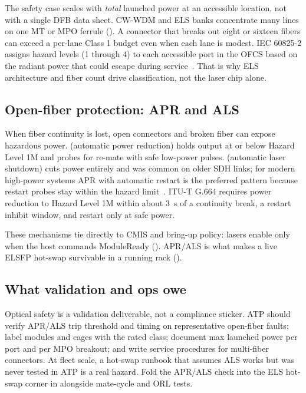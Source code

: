 The safety case scales with \emph{total} launched power at an accessible location,
not with a single DFB data sheet. CW-WDM and ELS banks concentrate many lines on one
MT or MPO ferrule (). A connector that breaks out eight or sixteen
fibers can exceed a per-lane Class 1 budget even when each lane is modest. IEC
60825-2 assigns hazard levels (1 through 4) to each accessible port in the OFCS
based on the radiant power that could escape during service~\cite{iec60825}. That
is why ELS architecture and fiber count drive classification, not the laser chip
alone.

\subsection{Open-fiber protection: APR and ALS}

When fiber continuity is lost, open connectors and broken fiber can expose
hazardous power.  (automatic power reduction) holds
output at or below Hazard Level 1M and probes for re-mate with safe low-power
pulses.  (automatic laser shutdown) cuts power entirely
and was common on older SDH links; for modern high-power systems APR with
automatic restart is the preferred pattern because restart probes stay within the
hazard limit~\cite{g664}. ITU-T G.664 requires power reduction to Hazard Level 1M
within about 3~s of a continuity break, a restart inhibit window, and restart only
at safe power.

These mechanisms tie directly to CMIS and bring-up policy: lasers enable only when
the host commands ModuleReady (). APR/ALS is what makes
a live ELSFP hot-swap survivable in a running rack ().

\subsection{What validation and ops owe}

Optical safety is a validation deliverable, not a compliance sticker. ATP should
verify APR/ALS trip threshold and timing on representative open-fiber faults; label
modules and cages with the rated class; document max launched power per port and per
MPO breakout; and write service procedures for multi-fiber connectors. At fleet
scale, a hot-swap runbook that assumes ALS works but was never tested in ATP is a
real hazard. Fold the APR/ALS check into the ELS hot-swap corner in
 alongside mate-cycle and ORL tests.

